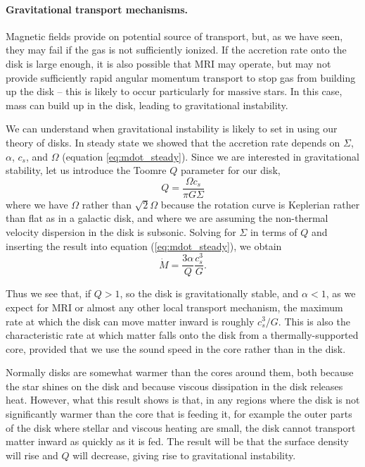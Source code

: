 \paragraph{Gravitational transport mechanisms.}

Magnetic fields provide on potential source of transport, but, as we have seen, they may fail if the gas is not sufficiently ionized. If the accretion rate onto the disk is large enough, it is also possible that MRI may operate, but may not provide sufficiently rapid angular momentum transport to stop gas from building up the disk -- this is likely to occur particularly for massive stars. In this case, mass can build up in the disk, leading to gravitational instability.

We can understand when gravitational instability is likely to set in using our theory of disks. In steady state we showed that the accretion rate depends on $\Sigma$, $\alpha$, $c_s$, and $\Omega$ (equation \ref{eq:mdot_steady}). Since we are interested in gravitational stability, let us introduce the Toomre $Q$ parameter for our disk,
\begin{equation}
Q = \frac{\Omega c_s}{\pi G \Sigma}
\end{equation}
where we have $\Omega$ rather than $\sqrt{2}\Omega$ because the rotation curve is Keplerian rather than flat as in a galactic disk, and where we are assuming the non-thermal velocity dispersion in the disk is subsonic. Solving for $\Sigma$ in terms of $Q$ and inserting the result into equation (\ref{eq:mdot_steady}), we obtain
\begin{equation}
\dot{M} = \frac{3\alpha}{Q} \frac{c_s^3}{G}.
\end{equation}

Thus we see that, if $Q > 1$, so the disk is gravitationally stable, and $\alpha < 1$, as we expect for MRI or almost any other local transport mechanism, the maximum rate at which the disk can move matter inward is roughly $c_s^3/G$. This is also the characteristic rate at which matter falls onto the disk from a thermally-supported core, provided that we use the sound speed in the core rather than in the disk.

Normally disks are somewhat warmer than the cores around them, both because the star shines on the disk and because viscous dissipation in the disk releases heat. However, what this result shows is that, in any regions where the disk is not significantly warmer than the core that is feeding it, for example the outer parts of the disk where stellar and viscous heating are small, the disk cannot transport matter inward as quickly as it is fed. The result will be that the surface density will rise and $Q$ will decrease, giving rise to gravitational instability.

